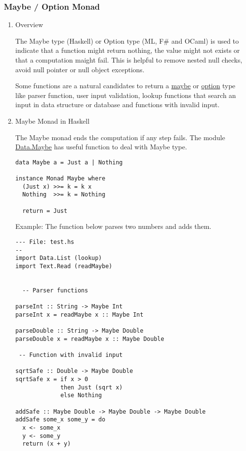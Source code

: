 \documentclass[11pt]{article}
\begin{document}
\subsubsection{Maybe / Option Monad}
\label{sec-1-13-3}
\begin{enumerate}
\item Overview
\label{sec-1-13-3-1}

The Maybe type (Haskell) or Option type (ML, F\# and OCaml) is used to
indicate that a function might return nothing, the value might not
exists or that a computation maight fail. This is helpful to remove
nested null checks, avoid null pointer or null object exceptions.

Some functions are a natural candidates to return a \uline{maybe} or
\uline{option} type like parser function, user input validation, lookup functions
that search an input in data structure or database and functions with
invalid input.

\item Maybe Monad in Haskell
\label{sec-1-13-3-2}

The Maybe monad ends the computation if any step fails. The module
\href{https://hackage.haskell.org/package/base-4.8.2.0/docs/Data-Maybe.html}{Data.Maybe} has useful function to deal with Maybe type.

\begin{verbatim}
data Maybe a = Just a | Nothing

instance Monad Maybe where
  (Just x) >>= k = k x
  Nothing  >>= k = Nothing

  return = Just
\end{verbatim}


Example: The function below parses two numbers and adds them. 

\begin{verbatim}
--- File: test.hs 
--
import Data.List (lookup)
import Text.Read (readMaybe)


  -- Parser functions 

parseInt :: String -> Maybe Int 
parseInt x = readMaybe x :: Maybe Int 

parseDouble :: String -> Maybe Double
parseDouble x = readMaybe x :: Maybe Double

 -- Function with invalid input 

sqrtSafe :: Double -> Maybe Double 
sqrtSafe x = if x > 0
             then Just (sqrt x)
             else Nothing

addSafe :: Maybe Double -> Maybe Double -> Maybe Double 
addSafe some_x some_y = do
  x <- some_x 
  y <- some_y 
  return (x + y)



\end{verbatim}
\end{enumerate}
\end{document}
